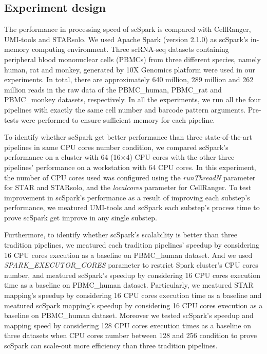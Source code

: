 \documentclass[conference]{IEEEtran}
\begin{document}
\subsection{Experiment design}
The performance in processing speed of scSpark is compared with CellRanger, UMI-tools and STARsolo. 
We used Apache Spark (version 2.1.0) as scSpark's in-memory computing environment. 
Three scRNA-seq datasets containing peripheral blood mononuclear cells (PBMCs) from three different species, namely human, rat and monkey, generated by 10X Genomics platform were used in our experiments. 
In total, there are approximately 640 million, 289 million and 262 million reads in the raw data of the PBMC\_human, PBMC\_rat and PBMC\_monkey datasets, respectively. 
In all the experiments, we run all the four pipelines with exactly the same cell number and barcode pattern arguments.
Pre-tests were performed to ensure sufficient memory for each pipeline.

To identify whether scSpark get better performance than three state-of-the-art pipelines in same CPU cores number condition,
we compared scSpark's performance on a cluster with 64 (16$\times$4) CPU cores with the other three pipelines' performance on a workstation with 64 CPU cores.
In this experiment, the number of CPU cores used was configured using the \textit{runThreadN} parameter for STAR and STARsolo, and the \textit{localcores} parameter for CellRanger. 
To test improvement in scSpark's performance as a result of improving each substep's performance,
we meatured UMI-tools and scSpark each substep's process time to prove scSpark get improve in any single substep.

Furthermore, to identify whether scSpark's scalability is better than three tradition pipelines, 
we meatured each tradition pipelines' speedup by considering 16 CPU cores execution as a baseline on PBMC\_human dataset.
And we used \textit{SPARK\_EXECUTOR\_CORES} parameter to restrict Spark cluster's CPU cores number, and meatured scSpark's speedup by considering 16 CPU cores execution time as a baseline on PBMC\_human dataset.
Particularly, we meatured STAR mapping's speedup by considering 16 CPU cores execution time as a baseline and meatured scSpark mapping's speedup by considering 16 CPU cores execution as a baseline on PBMC\_human dataset.
Moreover we tested scSpark's speedup and mapping speed by considering 128 CPU cores execution times as a baseline on three datasets when CPU cores number between 128 and 256 condition to prove scSpark can scale-out more efficiency than three tradition pipelines.
\end{document}
